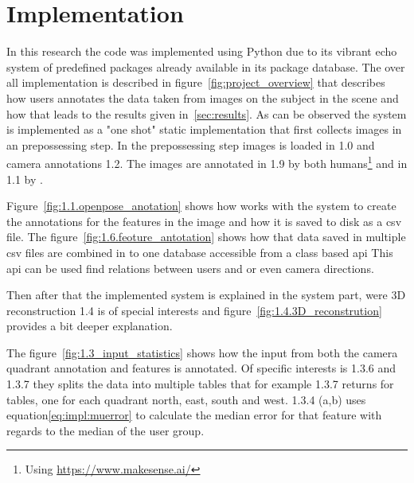 \section{Implementation}
\label{sec:work}

In this research the code was implemented using Python due to its vibrant echo system of predefined packages already available in its package database.
The over all implementation is described in figure~\ref{fig:project_overview} that describes how users annotates the data taken from images on the subject in the scene and how that leads to the results given in~\ref{sec:results}.
As can be observed the system is implemented  as a "one shot" static implementation that first collects images in an prepossessing step.
In the prepossessing step images is loaded in 1.0 and camera annotations 1.2.
The images are annotated in 1.9 by both humans\footnote{Using \url{https://www.makesense.ai/}} and in 1.1 by \openpose{ }.

Figure~\ref{fig:1.1.openpose_anotation} shows how \openpose{ } works with the system to create the annotations for the features in the image and how it is saved to disk as a \ac{csv} file.
The figure~\ref{fig:1.6.feoture_antotation} shows how that data saved in multiple \ac{csv} files are combined in to one database accessible from a class based \ac{api}
This \ac{api} can be used find relations between users and \openpose{ } or even camera directions.

Then after that the implemented system is explained in the system part, were 3D reconstruction 1.4 is of special interests and figure~\ref{fig:1.4.3D_reconstrution} provides a bit deeper explanation.

The figure~\ref{fig:1.3_input_statistics} shows how the input from both the camera quadrant annotation and features is annotated.
Of specific interests is 1.3.6 and 1.3.7 they splits the data into multiple tables that for example 1.3.7 returns for tables, one for each quadrant north, east, south and west.
1.3.4 (a,b) uses equation\ref{eq:impl:muerror} to calculate the median error for that feature with regards to the median of the user group.




